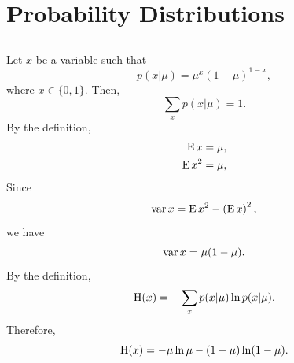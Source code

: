 \section{Probability Distributions}


\subsection{}
\label{2.1}
Let $x$ be a variable such that
%
\begin{equation}
p(x | \mu) 
= 
\mu ^ x 
(1 - \mu) ^ {1 - x},
\end{equation}
%
where $x \in \{ 0, 1 \}$.
Then,
%
\begin{equation}
\sum_{x} 
p(x | \mu) 
= 
1.
\end{equation}
%
By the definition,
%
\begin{equation}
\begin{aligned}
\operatorname{E} x 
&= 
\mu, 
\\
\operatorname{E} x ^ 2 
&= 
\mu,
\end{aligned}
\end{equation}
%
Since
%
\begin{equation}
\operatorname{var} x 
= 
\operatorname{E} x ^ 2 
- 
\left( 
	\operatorname{E} x 
\right) ^ 2,
\end{equation}
%
we have
%
\begin{equation}
\operatorname{var} x 
= 
\mu 
(1 - \mu).
\end{equation}
%
By the definition,
%
\begin{equation}
{\rm H}(x) 
= 
- 
\sum_{x} 
p(x | \mu) 
\ln p(x | \mu).
\end{equation}
%
Therefore,
%
\begin{equation}
{\rm H}(x) 
= 
- 
\mu 
\ln \mu 
- 
(1 - \mu) 
\ln (1 - \mu).
\end{equation}
%


